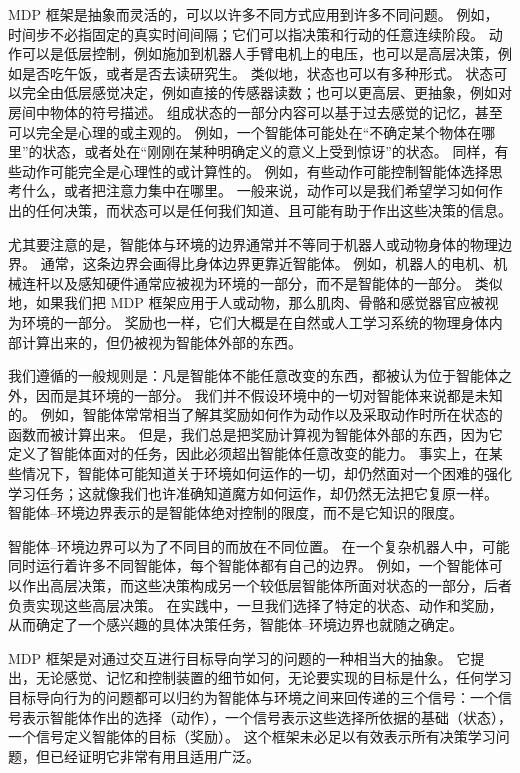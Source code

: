 \documentclass[UTF8, 12pt, fontset=fandol, oneside]{ctexart}
\begin{document}
MDP 框架是抽象而灵活的，可以以许多不同方式应用到许多不同问题。
例如，时间步不必指固定的真实时间间隔；它们可以指决策和行动的任意连续阶段。
动作可以是低层控制，例如施加到机器人手臂电机上的电压，也可以是高层决策，例如是否吃午饭，或者是否去读研究生。
类似地，状态也可以有多种形式。
状态可以完全由低层感觉决定，例如直接的传感器读数；也可以更高层、更抽象，例如对房间中物体的符号描述。
组成状态的一部分内容可以基于过去感觉的记忆，甚至可以完全是心理的或主观的。
例如，一个智能体可能处在“不确定某个物体在哪里”的状态，或者处在“刚刚在某种明确定义的意义上受到惊讶”的状态。
同样，有些动作可能完全是心理性的或计算性的。
例如，有些动作可能控制智能体选择思考什么，或者把注意力集中在哪里。
一般来说，动作可以是我们希望学习如何作出的任何决策，而状态可以是任何我们知道、且可能有助于作出这些决策的信息。

尤其要注意的是，智能体与环境的边界通常并不等同于机器人或动物身体的物理边界。
通常，这条边界会画得比身体边界更靠近智能体。
例如，机器人的电机、机械连杆以及感知硬件通常应被视为环境的一部分，而不是智能体的一部分。
类似地，如果我们把 MDP 框架应用于人或动物，那么肌肉、骨骼和感觉器官应被视为环境的一部分。
奖励也一样，它们大概是在自然或人工学习系统的物理身体内部计算出来的，但仍被视为智能体外部的东西。

我们遵循的一般规则是：凡是智能体不能任意改变的东西，都被认为位于智能体之外，因而是其环境的一部分。
我们并不假设环境中的一切对智能体来说都是未知的。
例如，智能体常常相当了解其奖励如何作为动作以及采取动作时所在状态的函数而被计算出来。
但是，我们总是把奖励计算视为智能体外部的东西，因为它定义了智能体面对的任务，因此必须超出智能体任意改变的能力。
事实上，在某些情况下，智能体可能知道关于环境如何运作的一切，却仍然面对一个困难的强化学习任务；这就像我们也许准确知道魔方如何运作，却仍然无法把它复原一样。
智能体--环境边界表示的是智能体绝对控制的限度，而不是它知识的限度。

智能体--环境边界可以为了不同目的而放在不同位置。
在一个复杂机器人中，可能同时运行着许多不同智能体，每个智能体都有自己的边界。
例如，一个智能体可以作出高层决策，而这些决策构成另一个较低层智能体所面对状态的一部分，后者负责实现这些高层决策。
在实践中，一旦我们选择了特定的状态、动作和奖励，从而确定了一个感兴趣的具体决策任务，智能体--环境边界也就随之确定。

MDP 框架是对通过交互进行目标导向学习的问题的一种相当大的抽象。
它提出，无论感觉、记忆和控制装置的细节如何，无论要实现的目标是什么，任何学习目标导向行为的问题都可以归约为智能体与环境之间来回传递的三个信号：一个信号表示智能体作出的选择（动作），一个信号表示这些选择所依据的基础（状态），一个信号定义智能体的目标（奖励）。
这个框架未必足以有效表示所有决策学习问题，但已经证明它非常有用且适用广泛。
\end{document}
